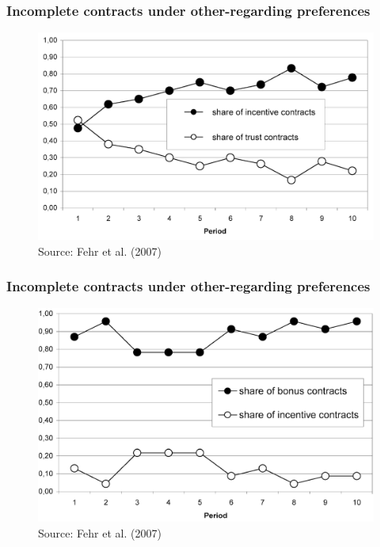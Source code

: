 \documentclass{beamer}
\begin{document}
\begin{frame}
	\frametitle{Incomplete contracts under other-regarding preferences}

	\begin{figure}
	\includegraphics[scale=0.3]{imagens/trustincentive.png}
	\caption{Source: Fehr et al. (2007)}
	\end{figure}
\end{frame}

\begin{frame}
	\frametitle{Incomplete contracts under other-regarding preferences}

	\begin{figure}
	\includegraphics[scale=0.21]{imagens/bonusincentive.png}
	\caption{Source: Fehr et al. (2007)}
	\end{figure}
\end{frame}
\end{document}
